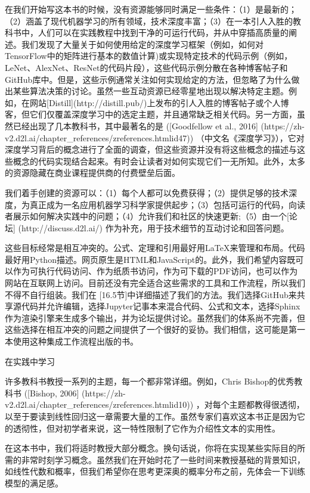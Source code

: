 在我们开始写这本书的时候，没有资源能够同时满足一些条件：（1）是最新的；（2）涵盖了现代机器学习的所有领域，技术深度丰富；（3）在一本引人入胜的教科书中，人们可以在实践教程中找到干净的可运行代码，并从中穿插高质量的阐述。我们发现了大量关于如何使用给定的深度学习框架（例如，如何对TensorFlow中的矩阵进行基本的数值计算)或实现特定技术的代码示例（例如，LeNet、AlexNet、ResNet的代码片段），这些代码示例分散在各种博客帖子和GitHub库中。但是，这些示例通常关注如何实现给定的方法，但忽略了为什么做出某些算法决策的讨论。虽然一些互动资源已经零星地出现以解决特定主题。例如，在网站[Distill](http://distill.pub/)上发布的引人入胜的博客帖子或个人博客，但它们仅覆盖深度学习中的选定主题，并且通常缺乏相关代码。另一方面，虽然已经出现了几本教科书，其中最著名的是 ([Goodfellow et al., 2016]
(https://zh-v2.d2l.ai/chapter\_references/zreferences.htmlid47))
（中文名《深度学习》），它对深度学习背后的概念进行了全面的调查，但这些资源并没有将这些概念的描述与这些概念的代码实现结合起来。有时会让读者对如何实现它们一无所知。此外，太多的资源隐藏在商业课程提供商的付费壁垒后面。

我们着手创建的资源可以：（1）每个人都可以免费获得；（2）提供足够的技术深度，为真正成为一名应用机器学习科学家提供起步；（3）包括可运行的代码，向读者展示如何解决实践中的问题；（4）允许我们和社区的快速更新;（5）由一个[论坛]
(http://discuss.d2l.ai/)
作为补充，用于技术细节的互动讨论和回答问题。

这些目标经常是相互冲突的。公式、定理和引用最好用LaTeX来管理和布局。代码最好用Python描述。网页原生是HTML和JavaScript的。此外，我们希望内容既可以作为可执行代码访问、作为纸质书访问，作为可下载的PDF访问，也可以作为网站在互联网上访问。目前还没有完全适合这些需求的工具和工作流程，所以我们不得不自行组装。我们在 [16.5节]中详细描述了我们的方法。我们选择GitHub来共享源代码并允许编辑，选择Jupyter记事本来混合代码、公式和文本，选择Sphinx作为渲染引擎来生成多个输出，并为论坛提供讨论。虽然我们的体系尚不完善，但这些选择在相互冲突的问题之间提供了一个很好的妥协。我们相信，这可能是第一本使用这种集成工作流程出版的书。

 在实践中学习

许多教科书教授一系列的主题，每一个都非常详细。例如，Chris Bishop的优秀教科书 ([Bishop, 2006]
(https://zh-v2.d2l.ai/chapter\_references/zreferences.htmlid10)) 
，对每个主题都教得很透彻，以至于要读到线性回归这一章需要大量的工作。虽然专家们喜欢这本书正是因为它的透彻性，但对初学者来说，这一特性限制了它作为介绍性文本的实用性。

在这本书中，我们将适时教授大部分概念。换句话说，你将在实现某些实际目的所需的非常时刻学习概念。虽然我们在开始时花了一些时间来教授基础的背景知识，如线性代数和概率，但我们希望你在思考更深奥的概率分布之前，先体会一下训练模型的满足感。

